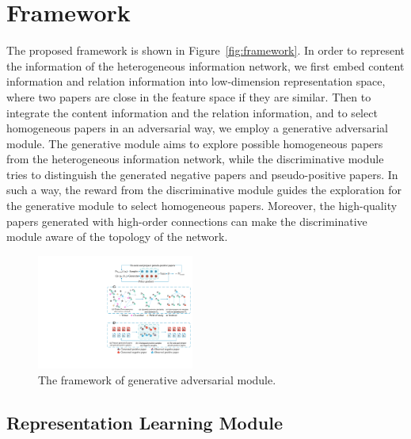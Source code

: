 \documentclass[letterpaper]{article} %
\begin{document}
\section{Framework}

The proposed framework is shown in Figure~\ref{fig:framework}.
In order to represent the information of the heterogeneous information network, we first embed content information and relation information into low-dimension representation space, where two papers are close in the feature space if they are similar.
Then to integrate the content information and the relation information, and to select homogeneous papers in an adversarial way, we employ a generative adversarial module.
The generative module aims to explore possible homogeneous papers from the heterogeneous information network, while the discriminative module tries to distinguish the generated negative papers and pseudo-positive papers.
In such a way, the reward from the discriminative module guides the exploration for the generative module to select homogeneous papers. Moreover, the high-quality papers generated with high-order connections can make the discriminative module aware of the topology of the network.
\begin{figure}[t]
\centering
\includegraphics[width=0.46\textwidth]{GAN1.pdf}
\caption{The framework of generative adversarial module.}
\label{fig:GAN_framework}
\end{figure}
\subsection{Representation Learning Module}
\end{document}
